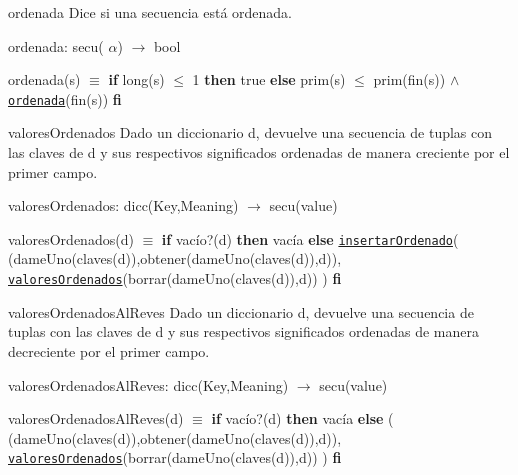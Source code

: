 \begin{DoxyParagraph}{ordenada}
Dice si una secuencia está ordenada.

ordenada\-: secu( $\alpha$) $\to$ bool \par
 ordenada(s) $\equiv$ {\bfseries if} long(s) $\leq$ 1 {\bfseries then} true {\bfseries else} prim(s) $\leq$ prim(fin(s)) $\land$ \href{axiomas.html#ordenada}{\tt ordenada}(fin(s)) {\bfseries fi} 


\end{DoxyParagraph}
\begin{DoxyParagraph}{valores\-Ordenados}
Dado un diccionario d, devuelve una secuencia de tuplas con las claves de d y sus respectivos significados ordenadas de manera creciente por el primer campo.

valores\-Ordenados\-: dicc(\-Key,\-Meaning) $\to$ secu(value) \par
 valores\-Ordenados(d) $\equiv$ {\bfseries if} vacío?(d) {\bfseries then} vacía {\bfseries else} \href{axiomas.html#insertarOrdenado}{\tt insertar\-Ordenado}( (dame\-Uno(claves(d)),obtener(dame\-Uno(claves(d)),d)), \href{axiomas.html#valoresOrdenados}{\tt valores\-Ordenados}(borrar(dame\-Uno(claves(d)),d)) ) {\bfseries fi} 


\end{DoxyParagraph}
\begin{DoxyParagraph}{valores\-Ordenados\-Al\-Reves}
Dado un diccionario d, devuelve una secuencia de tuplas con las claves de d y sus respectivos significados ordenadas de manera decreciente por el primer campo.

valores\-Ordenados\-Al\-Reves\-: dicc(\-Key,\-Meaning) $\to$ secu(value) \par
 valores\-Ordenados\-Al\-Reves(d) $\equiv$ {\bfseries if} vacío?(d) {\bfseries then} vacía {\bfseries else} ( (dame\-Uno(claves(d)),obtener(dame\-Uno(claves(d)),d)), \href{axiomas.html#valoresOrdenados}{\tt valores\-Ordenados}(borrar(dame\-Uno(claves(d)),d)) ) {\bfseries fi} 
\end{DoxyParagraph}

